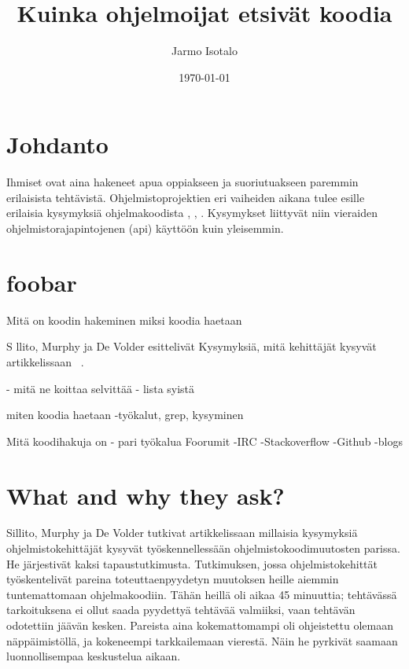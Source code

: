 \documentclass[finnish]{../tktltiki2}
\title{Kuinka ohjelmoijat etsivät koodia}
\author{Jarmo Isotalo}
\date{\today}
\theoremstyle{definition}
\theoremstyle{remark}
\begin{document}

\frontmatter      %

\maketitle        %

\tableofcontents  %


\mainmatter       %

\section{Johdanto}
Ihmiset ovat aina hakeneet apua oppiakseen ja suoriutuakseen paremmin erilaisista tehtävistä. %
Ohjelmistoprojektien eri vaiheiden aikana tulee esille erilaisia kysymyksiä ohjelmakoodista \cite{g_search_code}, \cite{questions-during-software-evolution-tasks}, \cite{asking-and-answering-api-questions}.
Kysymykset liittyvät niin vieraiden ohjelmistorajapintojenen (api) käyttöön \cite{jungloid-mining} kuin yleisemmin.

\section{foobar}
Mitä on koodin hakeminen
miksi koodia haetaan

S
llito, Murphy ja De Volder esittelivät Kysymyksiä, mitä kehittäjät kysyvät artikkelissaan ~\cite{questions-during-software-evolution-tasks}.

- mitä ne koittaa selvittää
  - lista syistä

miten koodia haetaan
-työkalut, grep, kysyminen

Mitä koodihakuja on
- pari työkalua
Foorumit
-IRC
-Stackoverflow
-Github
-blogs

\section{What and why they ask?}
Sillito, Murphy ja De Volder tutkivat artikkelissaan \cite{questions-during-software-evolution-tasks} millaisia kysymyksiä ohjelmistokehittäjät kysyvät työskennellessään ohjelmistokoodimuutosten parissa.
He järjestivät kaksi tapaustutkimusta. Tutkimuksen, jossa ohjelmistokehittät työskentelivät pareina toteuttaenpyydetyn muutoksen heille aiemmin tuntemattomaan ohjelmakoodiin. Tähän heillä oli aikaa 45 minuuttia; tehtävässä tarkoituksena ei ollut saada pyydettyä tehtävää valmiiksi, vaan tehtävän odotettiin jäävän kesken. Pareista aina kokemattomampi oli ohjeistettu olemaan näppäimistöllä, ja kokeneempi tarkkailemaan vierestä. Näin he pyrkivät saamaan luonnollisempaa keskustelua aikaan.
\end{document}
